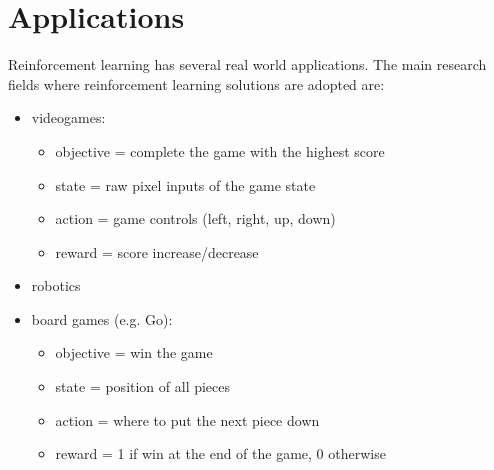 \section{Applications}
Reinforcement learning has several real world applications. The main research
fields where reinforcement learning solutions are adopted are:

\begin{itemize}
	\item videogames:
		\begin{itemize}
			\item objective = complete the game with the highest score

			\item state = raw pixel inputs of the game state

			\item action = game controls (left, right, up, down)

			\item reward = score increase/decrease
		\end{itemize}

	\item robotics

	\item board games (e.g. Go):
		\begin{itemize}
			\item objective = win the game

			\item state = position of all pieces

			\item action = where to put the next piece down

			\item reward = 1 if win at the end of the game, 0 otherwise
		\end{itemize}
\end{itemize}

